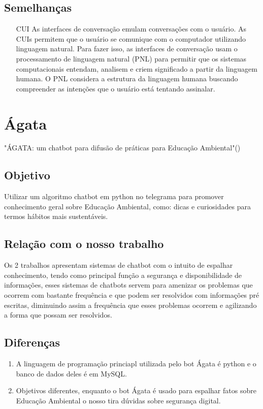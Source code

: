     \subsection{Semelhanças}
        \begin{enumerate}
            \item[CUI] 
                As interfaces de conversação emulam conversações com o usuário. As CUIs permitem que o usuário se comunique com o computador utilizando linguagem natural. Para fazer isso, as interfaces de conversação usam o processamento de linguagem natural (PNL) para permitir que os sistemas computacionais entendam, analisem e criem significado a partir da linguagem humana. O PNL considera a estrutura da linguagem humana buscando compreender as intenções que o usuário está tentando assinalar.
            
        \end{enumerate}

\section{Ágata}
    \begin{center}
        "ÁGATA: um chatbot para difusão de práticas para Educação Ambiental"(\cite{Agata})
    \end{center}

    \subsection{Objetivo}
        Utilizar um algoritmo chatbot em python no telegrama para promover conhecimento geral sobre Educação Ambiental, como: dicas e curiosidades para termos hábitos mais sustentáveis.
    
    \subsection{Relação com o nosso trabalho}
        Os 2 trabalhos apresentam sistemas de chatbot com o intuito de espalhar conhecimento, tendo como principal função a segurança e disponibilidade de informações, esses sistemas de chatbots servem para amenizar os problemas que ocorrem com bastante frequência e que podem ser resolvidos com informações pré escritas, diminuindo assim a frequência que esses problemas ocorrem e agilizando a forma que possam ser resolvidos.
    
    \subsection{Diferenças}
        \begin{enumerate}
            \item 
                A linguagem de programação princiapl utilizada pelo bot Ágata é python e o banco de dados deles é em MySQL.
            \item 
                Objetivos diferentes, enquanto o bot Ágata é usado para espalhar fatos sobre Educação Ambiental o nosso tira dúvidas sobre segurança digital.
        \end{enumerate}
    
